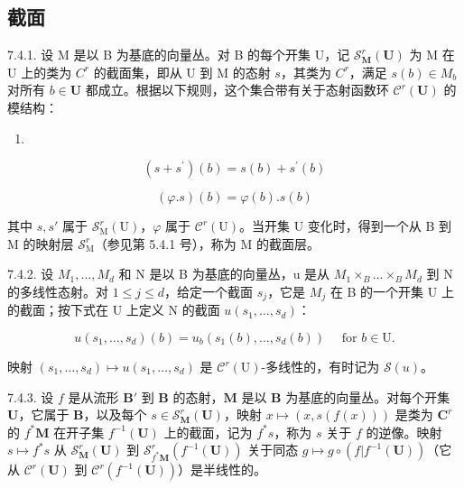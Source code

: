 \subsection{截面}

7.4.1. 设 M 是以 B 为基底的向量丛。对 B 的每个开集 U，记 \(\mathcal{S}_{\mathbf{M}}^{r}(\mathbf{U})\) 为 M 在 U 上的类为 \(C^r\) 的截面集，即从 U 到 M 的态射 \(s\)，其类为 \(C^r\)，满足 \(s(b) \in M_b\) 对所有 \(b \in \mathbf{U}\) 都成立。根据以下规则，这个集合带有关于态射函数环 \(\mathcal{C}^r(\mathbf{U})\) 的模结构：

\begin{enumerate}
\def\labelenumi{(\arabic{enumi})}
\tightlist
\item
\end{enumerate}

\[
(s + s ^ {\prime}) (b) = s (b) + s ^ {\prime} (b)\tag{2}
\]

\[
(\varphi . s) (b) = \varphi (b). s (b)
\]

其中 \(s, s'\) 属于 \(\mathcal{S}_{\mathrm{M}}^{r}(\mathrm{U})\)，\(\varphi\) 属于 \(\mathcal{C}^{r}(\mathrm{U})\)。当开集 U 变化时，得到一个从 B 到 M 的映射层 \(\mathcal{S}_{\mathrm{M}}^{r}\)（参见第 5.4.1 号），称为 M 的截面层。

7.4.2. 设 \(M_{1},\ldots,M_{d}\) 和 N 是以 B 为基底的向量丛，u 是从 \(M_{1}\times_{B}\ldots\times_{B}M_{d}\) 到 N 的多线性态射。对 \(1\leqslant j\leqslant d\)，给定一个截面 \(s_{j}\)，它是 \(M_{j}\) 在 B 的一个开集 U 上的截面；按下式在 U 上定义 N 的截面 \(u(s_{1},\ldots,s_{d})\)：

\[
u (s _ {1}, \dots , s _ {d}) (b) = u _ {b} (s _ {1} (b), \dots , s _ {d} (b)) \quad \text {   for   } b \in \mathrm{U}.
\]

映射 \((s_1, \ldots, s_d) \mapsto u(s_1, \ldots, s_d)\) 是 \(\mathcal{C}^r(\mathrm{U})\)-多线性的，有时记为 \(\mathcal{S}(u)\)。

7.4.3. 设 \(f\) 是从流形 \(\mathbf{B}'\) 到 \(\mathbf{B}\) 的态射，\(\mathbf{M}\) 是以 \(\mathbf{B}\) 为基底的向量丛。对每个开集 \(\mathbf{U}\)，它属于 \(\mathbf{B}\)，以及每个 \(s \in \mathcal{S}_{\mathbf{M}}^{r}(\mathbf{U})\)，映射 \(x \mapsto (x, s(f(x)))\) 是类为 \(\mathbf{C}^r\) 的 \(f^{*}\mathbf{M}\) 在开子集 \(f^{-1}(\mathbf{U})\) 上的截面，记为 \(f^{*}s\)，称为 \(s\) 关于 \(f\) 的逆像。映射 \(s \mapsto f^{*}s\) 从 \(\mathcal{S}_{\mathbf{M}}^{r}(\mathbf{U})\) 到 \(\mathcal{S}_{f^{*}\mathbf{M}}^{r}(f^{-1}(\mathbf{U}))\) 关于同态 \(g \mapsto g \circ (f|f^{-1}(\mathbf{U}))\)（它从 \(\mathcal{C}^{r}(\mathbf{U})\) 到 \(\mathcal{C}^{r}(f^{-1}(\mathbf{U}))\)）是半线性的。

